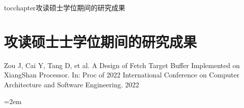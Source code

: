 
\newenvironment{thepublications}{\wuhao\song}

\addcontentsline{toc}{chapter}{攻读硕士学位期间的研究成果}%
\chapter*{\centering\xiaosan\hei\bfseries 攻读硕士士学位期间的研究成果}

\begin{thepublications}

\setlength{\parindent}{0em}
\begin{publist}
	\item Zou J, Cai Y, Tang D, et al. A Design of Fetch Target Buffer Implemented on XiangShan Processor. In: Proc of 2022 International Conference on Computer Architecture and Software Engineering. 2022
\end{publist}

\vfill
{}\hangindent=2em\noindent

\setlength{\parindent}{2em}

\end{thepublications}

